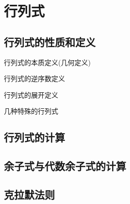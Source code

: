 \documentclass[8pt a4paper, oneside, UTF8]{ctexbook}
\begin{document}
\begin{sloppypar}
    \else
    \fi
    \chapter{行列式}
    \section{行列式的性质和定义}
    \begin{defn}{行列式的本质定义(几何定义)}{}

    \end{defn}
    \begin{defn}{行列式的逆序数定义}{}
        
    \end{defn}
    \begin{defn}{行列式的展开定义}{}
    \end{defn}
    \begin{criterion}{几种特殊的行列式}{}

    \end{criterion}
    \section{行列式的计算}
    
    \section{余子式与代数余子式的计算}
    
    \section{克拉默法则}
    
        \ifx\allfiles\undefined
    \end{sloppypar}
\end{document}
